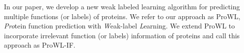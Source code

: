\documentclass{llncs} %
\begin{document}
\begin{comment}

similarity between proteins is updated based on most confidently predicted functions
Unlike traditional protein function prediction methods
which predict protein functions in an one-off procedure, recently, Chi et. al. \cite{chi2011iterative} proposed
an iterative protein function prediction method. The basic assumption of this
method is that the similarity between proteins will be updated if they are
partially annotated. To exploit this assumption, in each iteration,
they update the similarity between proteins based on the currently most
confidently predicted functions and then expand the predicted functions
using the updated similarity.\\
\indent
\end{comment}
In our paper,  we develop a new  weak labeled learning algorithm
for predicting multiple functions (or labels) of proteins.
We refer to our approach as ProWL, \textit{Pro}tein function prediction with \textit{W}eak-label \textit{L}earning. We extend ProWL to incorporate irrelevant function (or labels) information of proteins and call this approach as ProWL-IF.
\begin{comment}
We studied two scenarios: (i) We assume that we are given partial functions for a protein i.e., which
functions the protein may perform and (ii) We assume that we are given partial labels but XXX
{\bf HR not complete.}\textbf{I am not fully understanding your intention}
\end{comment}
\begin{comment}

  learning in protein function prediction and propose the ProWL and ProWL-C to
make use of incomplete annotations of proteins. Our experimental
evaluation demonstrates that ProWL and ProWL-C can replenish the missing
functions of proteins much better than other related methods. The
developed approaches outperform other related methods in predicting
the functions of proteins under various numbers of missing functions. In
addition, we corroborate the benefit in considering the missing
functions assumption in annotating proteins.
\end{comment}
\end{document}
